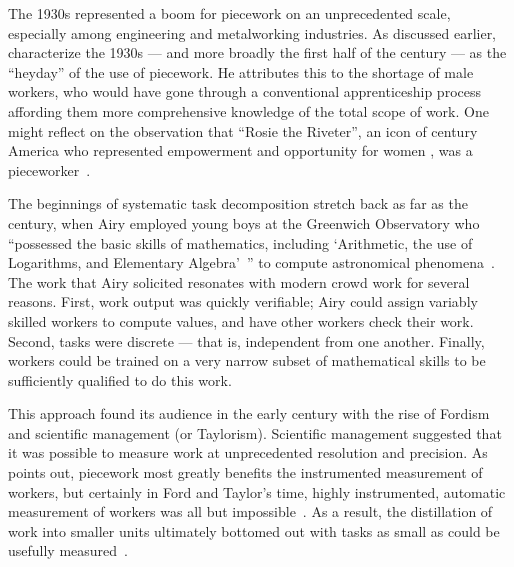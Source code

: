 \documentclass[trackingWork]{subfiles}
\begin{document}
The 1930s represented a boom for piecework on an unprecedented scale,
especially among engineering and metalworking industries.
As discussed earlier, \citeauthor{hart2013rise} characterize the 1930s
--- and more broadly the first half of the  century ---
as the ``heyday'' of the use of piecework.
He attributes this to the shortage of male workers,
who would have gone through a conventional apprenticeship process
affording them more comprehensive knowledge of the total scope of work.
One might reflect on the observation that ``Rosie the Riveter'',
an icon of  century America who represented empowerment and opportunity for women \cite{honey1985creating},
was a pieceworker~\cite{davies2014origins}.



The beginnings of
systematic task decomposition
stretch back as far as the  century,
when Airy employed young boys at the Greenwich Observatory who
``possessed the basic skills of mathematics, including
`Arithmetic, the use of Logarithms, and Elementary Algebra'~''
to compute astronomical phenomena~\cite{grier2013computers}.
The work that Airy solicited resonates with modern crowd work for several reasons.
First, work output was quickly verifiable;
Airy could assign variably skilled workers to compute values,
and have other workers check their work.
Second, tasks were discrete --- that is, independent from one another.
Finally, workers could be trained on a very narrow subset of mathematical skills to be
sufficiently qualified to do this work.

This approach found its audience in the early  century with the rise of Fordism and scientific management (or Taylorism).
Scientific management suggested that it was possible to measure work  at unprecedented resolution and precision.
As \citeauthor{Brown01041990} points out, piecework most greatly benefits the instrumented measurement of workers, but certainly in Ford and Taylor's time, highly instrumented, automatic measurement of workers was all but impossible~\cite{Brown01041990}.
As a result, the distillation of work into smaller units ultimately bottomed out with tasks as small as could be usefully measured~\cite{10.2307/23702539}.
\end{document}
